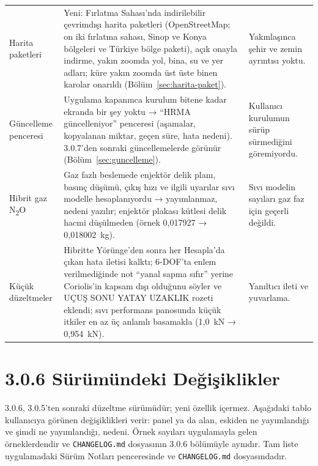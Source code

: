 \documentclass[11pt,a4paper]{article}
\newcommand{\ui}[1]{\textsf{#1}}
\newcommand{\kod}[1]{\texttt{#1}}
\begin{document}
\begin{longtable}{@{}>{\raggedright\arraybackslash}p{3.0cm}>{\raggedright\arraybackslash}p{8.0cm}>{\raggedright\arraybackslash}p{4.6cm}@{}}
Harita paketleri & Yeni: Fırlatma Sahası'nda indirilebilir çevrimdışı harita paketleri (OpenStreetMap; on iki fırlatma sahası, Sinop ve Konya bölgeleri ve Türkiye bölge paketi), açık onayla indirme, yakın zoomda yol, bina, su ve yer adları; küre yakın zoomda üst üste binen karolar onarıldı (Bölüm~\ref{sec:harita-paket}). & Yakınlaşınca şehir ve zemin ayrıntısı yoktu. \\
Güncelleme penceresi & Uygulama kapanınca kurulum bitene kadar ekranda bir şey yoktu → ``HRMA güncelleniyor'' penceresi (aşamalar, kopyalanan miktar, geçen süre, hata nedeni). 3.0.7'den sonraki güncellemelerde görünür (Bölüm~\ref{sec:guncelleme}). & Kullanıcı kurulumun sürüp sürmediğini göremiyordu. \\
Hibrit gaz N\textsubscript{2}O & Gaz fazlı beslemede enjektör delik planı, basınç düşümü, çıkış hızı ve ilgili uyarılar sıvı modelle hesaplanıyordu → yayımlanmaz, nedeni yazılır; enjektör plakası kütlesi delik hacmi düşülmeden (örnek 0,017927 → 0,018002~kg). & Sıvı modelin sayıları gaz faz için geçerli değildi. \\
Küçük düzeltmeler & Hibritte Yörünge'den sonra her Hesapla'da çıkan hata iletisi kalktı; 6-DOF'ta enlem verilmediğinde not ``yanal sapma sıfır'' yerine Coriolis'in kapsam dışı olduğunu söyler ve \ui{UÇUŞ SONU YATAY UZAKLIK} rozeti eklendi; sıvı performans panosunda küçük itkiler en az üç anlamlı basamakla (1,0~kN → 0,954~kN). & Yanıltıcı ileti ve yuvarlama. \\
\end{longtable}

\section{3.0.6 Sürümündeki Değişiklikler}\label{sec:v306}

3.0.6, 3.0.5'ten sonraki düzeltme sürümüdür; yeni özellik içermez. Aşağıdaki
tablo kullanıcıya görünen değişiklikleri verir: panel ya da alan, eskiden ne
yayımlandığı ve şimdi ne yayımlandığı, nedeni. Örnek sayıları uygulamayla gelen
örneklerdendir ve \kod{CHANGELOG.md} dosyasının 3.0.6 bölümüyle aynıdır. Tam liste uygulamadaki \ui{Sürüm Notları} penceresinde ve
\kod{CHANGELOG.md} dosyasındadır.
\end{document}
